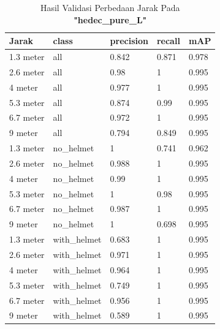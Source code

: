 \begin{enumerate}
  \begin{table}[ht]
    \centering
    \caption{Hasil Validasi Perbedaan Jarak Pada \textbf{"hedec\_pure\_L"}}
    \label{tb:hasiljarak_hedec_pure_L}
    \begin{tabular}{|l|l|l|l|l|} 
      \hline
      Jarak     & class        & precision & recall & mAP    \\ 
      \hline
      1.3 meter & all          & 0.842     & 0.871  & 0.978  \\
      2.6 meter & all          & 0.98      & 1      & 0.995  \\
      4 meter   & all          & 0.977     & 1      & 0.995  \\
      5.3 meter & all          & 0.874     & 0.99   & 0.995  \\
      6.7 meter & all          & 0.972     & 1      & 0.995  \\
      9 meter   & all          & 0.794     & 0.849  & 0.995  \\
      1.3 meter & no\_helmet   & 1         & 0.741  & 0.962  \\
      2.6 meter & no\_helmet   & 0.988     & 1      & 0.995  \\
      4 meter   & no\_helmet   & 0.99      & 1      & 0.995  \\
      5.3 meter & no\_helmet   & 1         & 0.98   & 0.995  \\
      6.7 meter & no\_helmet   & 0.987     & 1      & 0.995  \\
      9 meter   & no\_helmet   & 1         & 0.698  & 0.995  \\
      1.3 meter & with\_helmet & 0.683     & 1      & 0.995  \\
      2.6 meter & with\_helmet & 0.971     & 1      & 0.995  \\
      4 meter   & with\_helmet & 0.964     & 1      & 0.995  \\
      5.3 meter & with\_helmet & 0.749     & 1      & 0.995  \\
      6.7 meter & with\_helmet & 0.956     & 1      & 0.995  \\
      9 meter   & with\_helmet & 0.589     & 1      & 0.995  \\
      \hline
    \end{tabular}
  \end{table}


\end{enumerate}
